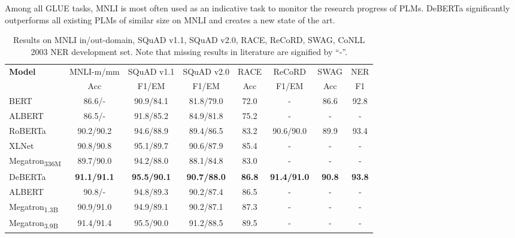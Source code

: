 \documentclass{article}
\newcommand\ModelName{DeBERTa}
\begin{document}
Among all GLUE tasks, MNLI is most often used as an indicative task to monitor the research progress of PLMs. 
{\ModelName} significantly outperforms all existing PLMs of similar size on MNLI and creates a new state of the art. \begin{table*}[htb!]
    \centering
    \begin{tabular}{@{\hskip2pt}l@{\hskip3pt}|@{\hskip2pt} c@{\hskip2pt}|| @{\hskip2pt}c@{\hskip2pt}@{\hskip2pt}c@{\hskip2pt}|@{\hskip2pt}c@{\hskip2pt}|@{\hskip2pt}c@{\hskip2pt}||@{\hskip2pt}c@{\hskip2pt}||@{\hskip2pt}c@{\hskip2pt}}
        \toprule
        \multirow{2}{*}{\bf Model} &{MNLI-m/mm} & {SQuAD v1.1} &{SQuAD v2.0} &RACE &ReCoRD  &SWAG & NER\\ 
        & Acc & F1/EM & F1/EM &Acc&F1/EM& {Acc}   & F1\\
        \midrule
        BERT & 86.6/-& 90.9/84.1 &81.8/79.0  &72.0 &-   &86.6 &92.8\\ \hline
        ALBERT & 86.5/-& 91.8/85.2 & 84.9/81.8 &75.2 &-  &-&- \\ \hline
        RoBERTa & 90.2/90.2& 94.6/88.9 & 89.4/86.5 &83.2 &90.6/90.0   &89.9 &93.4\\ \hline
        XLNet & 90.8/90.8& 95.1/89.7 & 90.6/87.9 &85.4 &-  &-&- \\ \hline
        Megatron\textsubscript{336M} & 89.7/90.0 & 94.2/88.0 & 88.1/84.8 &83.0 &-   &-&- \\ \hline
        {\ModelName} & \textbf{91.1/91.1} &\textbf{95.5/90.1} & \textbf{90.7/88.0} & \textbf{86.8} &\textbf{91.4/91.0}   &\textbf{90.8} &\textbf{93.8}\\ \hline \hline
        ALBERT & 90.8/-& 94.8/89.3 & 90.2/87.4 &86.5 &-  &-&- \\ \hline
        Megatron\textsubscript{1.3B} & 90.9/91.0 & 94.9/89.1 & 90.2/87.1 & 87.3 &- &-&- \\ \hline
        Megatron\textsubscript{3.9B} & 91.4/91.4 & 95.5/90.0 & 91.2/88.5 &89.5&-  &-&- \\      
        \bottomrule
        \end{tabular}
    \caption{
    Results on MNLI in/out-domain,  SQuAD v1.1, SQuAD v2.0, RACE, ReCoRD, SWAG, CoNLL 2003 NER development set. Note that missing results in literature are signified by ``-''.}
    \label{tab:large}
    \vspace{-4mm}
\end{table*}
\end{document}

